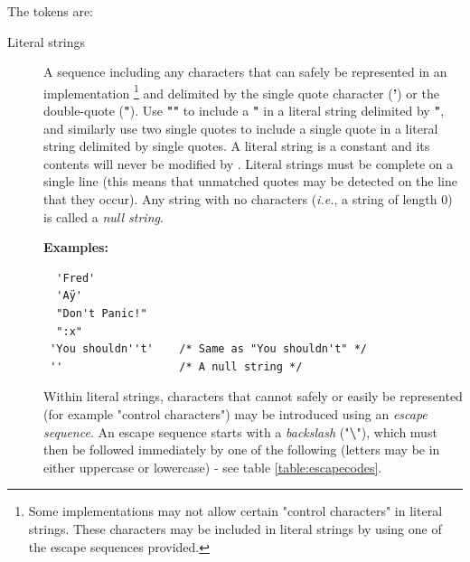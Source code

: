 The tokens are:
\begin{description}
\item[Literal strings]\label{refxstr}
\index{,}
\index{,}

A sequence including any characters that can safely be represented in
an implementation
\footnote{
Some implementations may not allow certain "control characters"
in literal strings.
These characters may be included in literal strings by using one of the
escape sequences provided.
}
and delimited by the single quote character (\textbf{'}) or the
double-quote (\textbf{"}).
Use \textbf{""} to include a \textbf{"} in a literal
string delimited by \textbf{"}, and similarly use two single
quotes to include a single quote in a literal string delimited by
single quotes.
A literal string is a constant and its contents will never be modified
by \crexx{}.
Literal strings must be complete on a single line (this means that
unmatched quotes may be detected on the line that they occur).
 Any string with no characters (\emph{i.e.}, a string of length 0) is called
a \emph{null string}.
 
\textbf{Examples:}
\begin{lstlisting}
  'Fred'
  'Aÿ'
  "Don't Panic!"
  ":x"
 'You shouldn''t'    /* Same as "You shouldn't" */
 ''                  /* A null string */
\end{lstlisting}
 
Within literal strings, characters that cannot safely or easily be
represented (for example "control characters") may be introduced
using an \emph{escape sequence}.  An escape sequence starts with a
\emph{backslash} ("\textbf{\textbackslash }"), which must then be
followed immediately by one of the following (letters may be in either
uppercase or lowercase) - see table \ref{table:escapecodes}.


\end{description}
